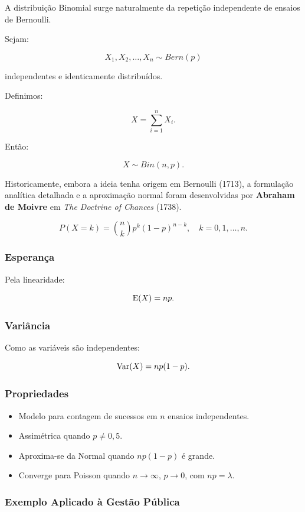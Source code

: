A distribuição Binomial surge naturalmente da repetição independente de
ensaios de Bernoulli. \vskip0.3cm

Sejam:

\[
X_1, X_2, \dots, X_n \sim Bern(p)
\]

independentes e identicamente distribuídos.

Definimos:

\[
X = \sum_{i=1}^{n} X_i.
\]

Então:

\[
X \sim Bin(n,p).
\]

Historicamente, embora a ideia tenha origem em Bernoulli (1713), a formulação
analítica detalhada e a aproximação normal foram desenvolvidas por
\textbf{Abraham de Moivre} em \textit{The Doctrine of Chances} (1738).


\[
P(X=k)=\binom{n}{k}p^k(1-p)^{n-k},
\quad k=0,1,\dots,n.
\]

\subsubsection*{Esperança}

Pela linearidade:

\[
\operatorname{E}(X)=np.
\]

\subsubsection*{Variância}

Como as variáveis são independentes:

\[
\operatorname{Var}(X)=np(1-p).
\]

\subsubsection*{Propriedades}

\begin{itemize}
\item Modelo para contagem de sucessos em $n$ ensaios independentes.
\item Assimétrica quando $p \neq 0,5$.
\item Aproxima-se da Normal quando $np(1-p)$ é grande.
\item Converge para Poisson quando $n \to \infty$, $p \to 0$, com $np=\lambda$.
\end{itemize}

\subsubsection*{Exemplo Aplicado à Gestão Pública}

